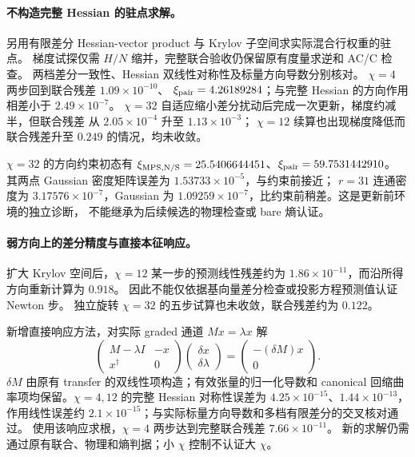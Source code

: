 \documentclass[11pt]{article}
\begin{document}
\paragraph{不构造完整 Hessian 的驻点求解。}
另用有限差分 Hessian-vector product 与 Krylov 子空间求实际混合行权重的驻点。
梯度试探仅需 $H/N$ 缩并，完整联合验收仍保留原有度量求逆和 AC/C 检查。
两档差分一致性、Hessian 双线性对称性及标量方向导数分别核对。
$\chi=4$ 两步回到联合残差 $1.09\times10^{-10}$、
$\xi_{\rm pair}=4.26189284$；与完整 Hessian 的方向作用相差小于
$2.49\times10^{-7}$。
$\chi=32$ 自适应缩小差分扰动后完成一次更新，梯度约减半，但联合残差
从 $2.05\times10^{-4}$ 升至 $1.13\times10^{-3}$；
$\chi=12$ 续算也出现梯度降低而联合残差升至 $0.249$ 的情况，均未收敛。

$\chi=32$ 的方向约束初态有
$\xi_{\rm MPS,N/S}=25.5406644451$、$\xi_{\rm pair}=59.7531442910$。
其两点 Gaussian 密度矩阵误差为 $1.53733\times10^{-5}$，与约束前接近；
$r=31$ 连通密度为 $3.17576\times10^{-7}$，Gaussian 为
$1.09259\times10^{-7}$，比约束前稍差。这是更新前环境的独立诊断，
不能继承为后续候选的物理检查或 bare 熵认证。

\paragraph{弱方向上的差分精度与直接本征响应。}
扩大 Krylov 空间后，$\chi=12$ 某一步的预测线性残差约为
$1.86\times10^{-11}$，而沿所得方向重新计算为 $0.918$。
因此不能仅依据基向量差分检查或投影方程预测值认证 Newton 步。
独立旋转 $\chi=32$ 的五步试算也未收敛，联合残差约为 $0.122$。

新增直接响应方法，对实际 graded 通道 $Mx=\lambda x$ 解
\[
\begin{pmatrix}M-\lambda I&-x\\x^\dagger&0\end{pmatrix}
\begin{pmatrix}\delta x\\\delta\lambda\end{pmatrix}
=\begin{pmatrix}-(\delta M)x\\0\end{pmatrix}.
\]
$\delta M$ 由原有 transfer 的双线性项构造；有效张量的归一化导数和
canonical 回缩曲率项均保留。$\chi=4,12$ 的完整 Hessian 对称性误差为
$4.25\times10^{-15}$、$1.44\times10^{-13}$，作用线性误差约
$2.1\times10^{-15}$；与实际标量方向导数和多档有限差分的交叉核对通过。
使用该响应求根，$\chi=4$ 两步达到完整联合残差 $7.66\times10^{-11}$。
新的求解仍需通过原有联合、物理和熵判据；小 $\chi$ 控制不认证大 $\chi$。
\end{document}
